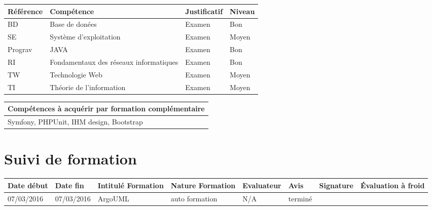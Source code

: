 \documentclass[11pt]{article}
\begin{document}
\begin{table}[!hp]
\centering
	\begin{tabularx}{\linewidth}{|X|X|X|X|}
	\hline
	\rowcolor{gray!40} Référence & Compétence & Justificatif & Niveau \\
	\hline
	 BD & Base de donées & Examen & Bon \\
	\hline
	 SE & Système d'exploitation & Examen & Moyen \\
	\hline
	 Prograv & JAVA & Examen & Bon \\
	\hline
	 RI & Fondamentaux des réseaux informatiques & Examen & Bon \\
	\hline
	 TW & Technologie Web & Examen & Moyen \\
	\hline
	TI & Théorie de l'information  & Examen & Moyen \\
	\hline
	\end{tabularx}
\end{table}

\begin{table}[!hp]
\centering
	\begin{tabularx}{\linewidth}{|X|}
	\hline
	\rowcolor{gray!40} Compétences à acquérir par formation complémentaire \\
	\hline
	 Symfony, PHPUnit, IHM design, Bootstrap \\
	\hline
	\end{tabularx}
\end{table}

\section*{\large Suivi de formation}




\centering
	\begin{longtable}{|p{1.9cm}|p{1.9cm}|p{1.9cm}|p{1.9cm}|p{1cm}|p{1.5cm}|p{1.5cm}|p{1.5cm}|}
	\hline
	\rowcolor{gray!40} \tiny Date début & \tiny Date fin & \tiny Intitulé Formation & \tiny Nature Formation & \tiny Evaluateur & \tiny Avis & \tiny Signature & \tiny Évaluation à froid \\
	\hline
	07/03/2016 &07/03/2016 &ArgoUML &auto formation & N/A & terminé & & \\
	\hline
	\end{longtable}
\end{document}
